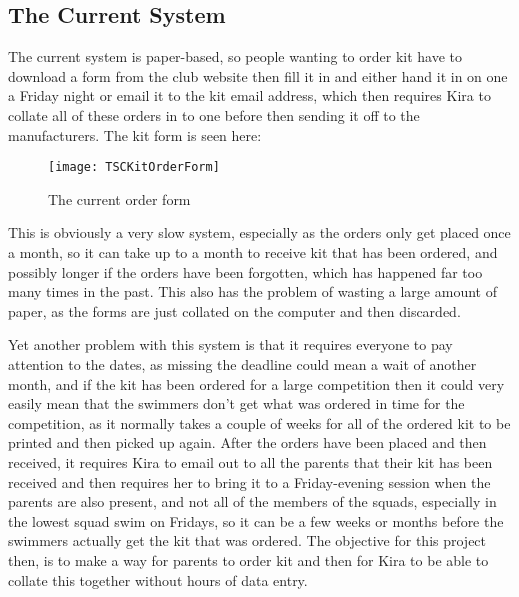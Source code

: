 \documentclass[
11pt, %
a4paper, %
oneside, %
headinclude,footinclude, %
BCOR5mm, %
]{scrartcl}
\begin{document}
\subsection{The Current System}
The current system is paper-based, so people wanting to order kit have to download a form from the club website then fill it in and either hand it in on one a Friday night or email it to the kit email address, which then requires Kira to collate all of these orders in to one before then sending it off to the manufacturers. The kit form is seen here:
\par 
\begin{figure}[h]
	\centering
	\texttt{[image: TSCKitOrderForm]}
	\caption{The current order form}
	\label{TSCOrderForm}
\end{figure}
\par This is obviously a very slow system, especially as the orders only get placed once a month, so it can take up to a month to receive kit that has been ordered, and possibly longer if the orders have been forgotten, which has happened far too many times in the past. This also has the problem of wasting a large amount of paper, as the forms are just collated on the computer and then discarded. \par 
Yet another problem with this system is that it requires everyone to pay attention to the dates, as missing the deadline could mean a wait of another month, and if the kit has been ordered for a large competition then it could very easily mean that the swimmers don't get what was ordered in time for the competition, as it normally takes a couple of weeks for all of the ordered kit to be printed and then picked up again. After the orders have been placed and then received, it requires Kira to email out to all the parents that their kit has been received and then requires her to bring it to a Friday-evening session when the parents are also present, and not all of the members of the squads, especially in the lowest squad swim on Fridays, so it can be a few weeks or months before the swimmers actually get the kit that was ordered. The objective for this project then, is to make a way for parents to order kit and then for Kira to be able to collate this together without hours of data entry.
\end{document}
